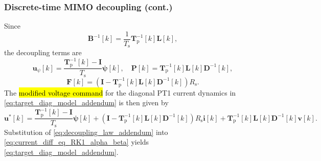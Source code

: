 \begin{frame}
    \frametitle{Discrete-time MIMO decoupling (cont.)}
    Since
    \begin{equation}
        \bm{B}^{-1}[k]=\frac{1}{T_\mathrm{s}}\bm{T}_\mathrm{p}^{-1}[k]\bm{L}[k],
    \end{equation}\pause%
    the decoupling terms are
    \begin{equation}
        \bm{u}_{\psi}[k]=\frac{\bm{T}_\mathrm{p}^{-1}[k]-\bm{I}}{T_\mathrm{s}}\bm{\psi}[k],
        \quad
        \bm{P}[k]=\bm{T}_\mathrm{p}^{-1}[k]\bm{L}[k]\bm{D}^{-1}[k],
    \end{equation}
    \begin{equation}
        \bm{F}[k]=\left(\bm{I}-\bm{T}_\mathrm{p}^{-1}[k]\bm{L}[k]\bm{D}^{-1}[k]\right)R_\mathrm{s} .
    \end{equation}\pause%
    The \hl{modified voltage command} for the diagonal PT1 current dynamics in \eqref{eq:target_diag_model_addendum} is then given by
    \begin{equation}
        \bm{u}^{*}[k]=\frac{\bm{T}_\mathrm{p}^{-1}[k]-\bm{I}}{T_\mathrm{s}}\bm{\psi}[k]
        +\left(\bm{I}-\bm{T}_\mathrm{p}^{-1}[k]\bm{L}[k]\bm{D}^{-1}[k]\right)R_\mathrm{s}\bm{i}[k]
        +\bm{T}_\mathrm{p}^{-1}[k]\bm{L}[k]\bm{D}^{-1}[k]\bm{v}[k] .
        \label{eq:decoupling_law_addendum}
    \end{equation}
    Substitution of \eqref{eq:decoupling_law_addendum} into \eqref{eq:current_diff_eq_RK1_alpha_beta} yields \eqref{eq:target_diag_model_addendum}.
\end{frame}


